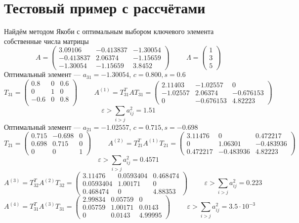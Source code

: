 \documentclass[11pt,a4paper]{article}
\let\epsilon\varepsilon
\renewcommand\;{\hspace{1cm}}
\begin{document}
\section{Тестовый пример с рассчётами}
Найдём методом Якоби с оптимальным выбором ключевого элемента собственные числа матрицы \[
  A = \begin{pmatrix}
    3.09106 & -0.413837 & -1.30054\\
    -0.413837 & 2.06374 & -1.15659\\
    -1.30054 & -1.15659 & 3.8452
  \end{pmatrix} \; \Lambda = \begin{pmatrix}
    1 \\ 3 \\ 5
  \end{pmatrix}
\]
Оптимальный элемент --- $a_{31} = -1.30054$, $c = 0.800, s = 0.6$ \[
  T_{31} = \begin{pmatrix}
    0.8 & 0 & 0.6 \\
    0 & 1 & 0\\
    -0.6 & 0 & 0.8\\
  \end{pmatrix} \; A^{(1)} = T_{31}^{T}AT_{31} = \begin{pmatrix}
    2.11403 & -1.02557 & 0\\
    -1.02557 & 2.06374 & -0.676153\\
    0 & -0.676153 & 4.82223
  \end{pmatrix}
\]\[
  \epsilon > \sum_{i>j}a_{ij}^{2} = 1.51
\]
Оптимальный элемент --- $a_{21} = -1.02557$, $c = 0.715, s = -0.698$ \[
  T_{21} = \begin{pmatrix}
    0.715 & -0.698 & 0\\
    0.698 & 0.715 & 0\\
    0 & 0 & 1
    \end{pmatrix} \; A^{(2)} = T_{21}^{T}A^{(1)}T_{21} = \begin{pmatrix}
    3.11476 & 0 & 0.472217\\
    0 & 1.06301 & -0.483936\\
    0.472217 & -0.483936 & 4.82223
  \end{pmatrix}
\]\[
  \epsilon > \sum_{i>j}a_{ij}^{2} = 0.4571
\]\[
  A^{(3)} = T_{32}^{T}A^{(2)}T_{32} = \begin{pmatrix}
    3.11476 & 0.0593404 & 0.468474\\
    0.0593404 & 1.00171 & 0\\
    0.468474 & 0 & 4.88353
  \end{pmatrix}
\;
\epsilon > \sum_{i>j}a_{ij}^{2} = 0.223
\]\[
  A^{(4)} = T_{31}^{T}A^{(3)}T_{31} = \begin{pmatrix}
    2.99834 & 0.05759 & 0\\
    0.05759 & 1.00171 & 0.0143\\
    0 & 0.0143 & 4.99995
\end{pmatrix}
\;
\epsilon > \sum_{i>j}a_{ij}^{2} = 3.5\cdot10^{-3}
\]
\end{document}
